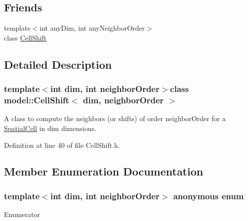 \subsection*{Friends}
\begin{DoxyCompactItemize}
\item 
{\footnotesize template$<$int any\+Dim, int any\+Neighbor\+Order$>$ }\\class \hyperlink{classmodel_1_1_cell_shift_a710c956f234de98c0962a73bf402c186}{Cell\+Shift}
\end{DoxyCompactItemize}


\subsection{Detailed Description}
\subsubsection*{template$<$int dim, int neighbor\+Order$>$class model\+::\+Cell\+Shift$<$ dim, neighbor\+Order $>$}

A class to compute the neighbors (or shifts) of order neighbor\+Order for a \hyperlink{structmodel_1_1_spatial_cell}{Spatial\+Cell} in dim dimensions. 

Definition at line 40 of file Cell\+Shift.\+h.



\subsection{Member Enumeration Documentation}
\hypertarget{classmodel_1_1_cell_shift_ab1590de7ef0bb9642434e2950f5771b2}{}\subsubsection[{anonymous enum}]{\setlength{\rightskip}{0pt plus 5cm}template$<$int dim, int neighbor\+Order$>$ anonymous enum}\label{classmodel_1_1_cell_shift_ab1590de7ef0bb9642434e2950f5771b2}
\begin{Desc}
\item[Enumerator]\par
\begin{description}
\item[{\em 
\hypertarget{classmodel_1_1_cell_shift_ab1590de7ef0bb9642434e2950f5771b2aee4134d6cbf2ecb50b24a8d678fed79f}{}Nneighbors\label{classmodel_1_1_cell_shift_ab1590de7ef0bb9642434e2950f5771b2aee4134d6cbf2ecb50b24a8d678fed79f}
}]\end{description}
\end{Desc}


